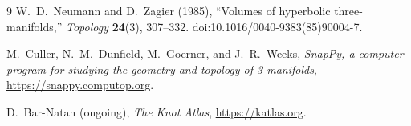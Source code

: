 \documentclass[11pt,a4paper]{article}
\begin{document}
\begin{thebibliography}{9}
                W.~D.~Neumann and D.~Zagier (1985),
                ``Volumes of hyperbolic three-manifolds,''
                \emph{Topology} \textbf{24}(3), 307--332.
                doi:10.1016/0040-9383(85)90004-7.

                M.~Culler, N.~M.~Dunfield, M.~Goerner, and J.~R.~Weeks,
                \emph{SnapPy, a computer program for studying the geometry and topology of 3-manifolds},
                \url{https://snappy.computop.org}.

                D.~Bar-Natan (ongoing),
                \emph{The Knot Atlas},
                \url{https://katlas.org}.
            \end{thebibliography}
\end{document}
